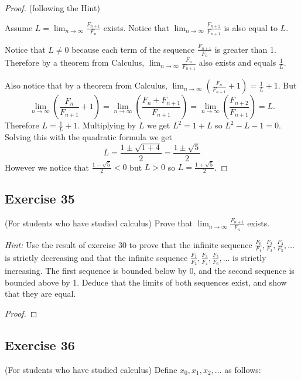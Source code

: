 \documentclass[14pt]{extarticle}
\newcommand{\dps}{\displaystyle}
\begin{document}
\begin{proof}
(following the Hint)

Assume \(\dps L = \lim_{n \to \infty} \frac{F_{n+1}}{F_n}\) exists. Notice that \(\dps \lim_{n \to \infty} 
\frac{F_{n+2}} {F_{n+1}}\) is also equal to $L$.

Notice that \(L \neq 0\) because each term of the sequence \(\dps \frac{F_{n+1}}{F_n}\) is greater than 1. Therefore
by a theorem from Calculus, \(\dps \lim_{n \to \infty} \frac{F_{n}}{F_{n+1}}\) also exists and equals \(\dps \frac{1}{L}\).

Also notice that by a theorem from Calculus, \(\dps \lim_{n \to \infty} \left(\frac{F_n}{F_{n+1}} + 1\right) = \frac{1}{L} + 1.\) But 
\[
\lim_{n \to \infty} \left(\frac{F_n}{F_{n+1}} + 1\right) = \lim_{n \to \infty} \left(\frac{F_n + F_{n+1}}{F_{n+1}}
\right) = 
\lim_{n \to \infty} \left(\frac{F_{n+2}}{F_{n+1}}\right) = L.
\]
Therefore \(\dps L = \frac{1}{L} + 1.\) Multiplying by $L$ we get \(L^2 = 1 + L\) so \(L^2 - L - 1 = 0\). Solving this
with the quadratic formula we get
\[
L = \frac{1 \pm \sqrt{1 + 4}}{2} = \frac{1 \pm \sqrt{5}}{2}
\]
However we notice that \(\dps \frac{1 - \sqrt{5}}{2} < 0\) but \(L > 0\) so \(\dps L = \frac{1 + \sqrt{5}}{2}\).
\end{proof}

\subsection{Exercise 35}
(For students who have studied calculus) Prove that \(\dps \lim_{n \to \infty} \frac{F_{n+1}}{F_n}\) exists.

{\it Hint:} Use the result of exercise 30 to prove that the
infinite sequence \(\dps \frac{F_0}{F_1}, \frac{F_2}{F_3}, 
\frac{F_4}{F_5}, \ldots\) is strictly decreasing and that the infinite sequence \(\dps \frac{F_1}{F_2}, \frac{F_3}
{F_4}, \frac{F_5}{F_6}, \ldots\) is strictly increasing. The first sequence is bounded below by 0, and the second 
sequence is bounded above by 1. Deduce that the limits of both sequences exist, and show that they are equal.

\begin{proof}

\end{proof}

\subsection{Exercise 36}
(For students who have studied calculus) Define $x_0, x_1, x_2, \ldots$ as follows:
\end{document}
